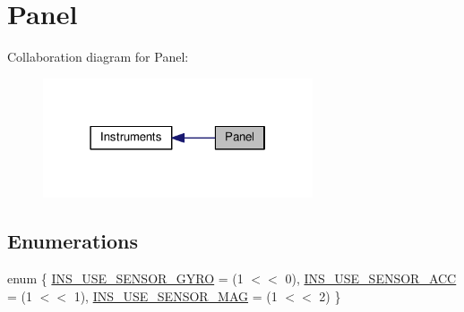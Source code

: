\hypertarget{group__Instrument}{\section{Panel}
\label{group__Instrument}
}
Collaboration diagram for Panel\+:
\nopagebreak
\begin{figure}[H]
\begin{center}
\leavevmode
\includegraphics[width=226pt]{group__Instrument}
\end{center}
\end{figure}
\subsection*{Enumerations}
\begin{DoxyCompactItemize}
\item 
enum \{ \hyperlink{group__Instrument_gga39fca1837c5ce7715cbf571669660c13a84c831c31d7f2a8e2023ca769f6732af}{I\+N\+S\+\_\+\+U\+S\+E\+\_\+\+S\+E\+N\+S\+O\+R\+\_\+\+G\+Y\+R\+O} = (1 $<$$<$ 0), 
\hyperlink{group__Instrument_gga39fca1837c5ce7715cbf571669660c13ae8a4c4e97a3c558da476d0574d24939d}{I\+N\+S\+\_\+\+U\+S\+E\+\_\+\+S\+E\+N\+S\+O\+R\+\_\+\+A\+C\+C} = (1 $<$$<$ 1), 
\hyperlink{group__Instrument_gga39fca1837c5ce7715cbf571669660c13a2695c458b15adb459d132fc4240062e4}{I\+N\+S\+\_\+\+U\+S\+E\+\_\+\+S\+E\+N\+S\+O\+R\+\_\+\+M\+A\+G} = (1 $<$$<$ 2)
 \}
\end{DoxyCompactItemize}
